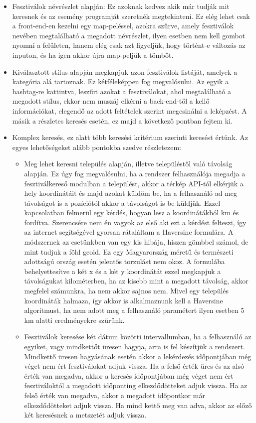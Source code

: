 \begin{itemize}
\item Fesztiválok névrészlet alapján:  Ez azoknak kedvez akik már tudják mit keresnek és az esemény programját szeretnék megtekinteni. Ez elég lehet csak a front-end-en kezelni egy map-peléssel, azokra szűrve, amely fesztiválok nevében megtalálható a megadott névrészlet, ilyen esetben nem kell gombot nyomni a felületen, hanem elég csak azt figyeljük, hogy történt-e változás az inputon, és ha igen akkor újra map-peljük a tömböt.

\item Kiválasztott stílus alapján megkapjuk azon fesztiválok listáját, amelyek a kategória alá tartoznak. Ez kétféleképpen fog megvalósulni. Az egyik a hashtag-re kattintva, leszűri azokat a fesztiválokat, ahol megtalálható a megadott stílus, ekkor nem muszáj elkérni a back-end-től a kellő információkat, elegendő az adott feltételek szerint megcsinálni a leképzést. A másik a részletes keresés esetén, ez majd a következő pontban fejtem ki.

\item Komplex keresés, ez alatt több keresési kritérium szerinti keresést értünk. Az egyes lehetőségeket alább pontokba szedve részletezem: 
\begin{itemize}
\item Meg lehet keresni település alapján, illetve településtől való távolság alapján. Ez úgy fog megvalósulni, ha a rendszer felhasználója megadja a fesztiválkereső modulban a települést, akkor a térkép API-tól elkérjük a hely koordinátáit és majd azokat küldöm be, ha a felhasználó ad meg távolságot is a pozíciótól akkor a távolságot is be küldjük. Ezzel kapcsolatban felmerül egy kérdés, hogyan lesz a koordinátákból km és fordítva. Szerencsére nem én vagyok az első aki ezt a kérdést felteszi, így az internet segítségével gyorsan rátaláltam a Haversine formulára. A módszernek az esetünkben van egy kis hibája, hiszen gömbbel számol, de mint tudjuk a föld geoid. Ez egy Magyarország méretű és természeti adottságú ország esetén jelentős torzulást nem okoz. A formulába behelyettesítve a két x és a két y koordinátát ezzel megkapjuk a távolságukat kilométerben, ha az kisebb mint a megadott távolság, akkor megfelel számunkra, ha nem akkor sajnos nem. Mivel egy település koordináták halmaza, így akkor is alkalmaznunk kell a Haversine algoritmust, ha nem adott meg a felhasználó paramétert ilyen esetben 5 km alatti eredményekre szűrünk. 

\item Fesztiválok keresése két dátum közötti intervallumban, ha a felhasználó az egyiket, vagy mindkettőt üresen hagyja, arra is fel készítjük a rendszert. Mindkettő üresen hagyásának esetén akkor a lekérdezés időpontjában még véget nem ért fesztiválokat adjuk vissza. Ha a felső érték üres és az alsó érték van megadva, akkor a keresés időpontjában még véget nem ért fesztiváloktól a megadott időponting elkezdődötteket adjuk vissza. Ha az felső érték van megadva, akkor a megadott időpontkor már elkezdődötteket adjuk vissza. Ha mind kettő meg van adva, akkor az előző két keresésnek a metszetét adjuk vissza.


\end{itemize}
\end{itemize}

